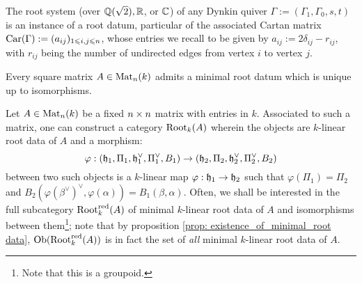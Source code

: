             \begin{example} \label{example: root_data_of_dynkin_quivers}
                The root system (over $\mathbb{Q}(\sqrt{2}), \mathbb{R}$, or $\mathbb{C}$) of any Dynkin quiver $\Gamma := (\Gamma_1, \Gamma_0, s, t)$ is an instance of a root datum, particular of the associated Cartan matrix $\mathrm{Car}(\Gamma) := (a_{ij})_{1 \leqslant i, j \leqslant n}$, whose entries we recall to be given by $a_{ij} := 2\delta_{ij} - r_{ij}$, with $r_{ij}$ being the number of undirected edges from vertex $i$ to vertex $j$. 
            \end{example}
            \begin{proposition} \label{prop: existence_of_minimal_root data}
                \cite[Proposition 14.2]{carter_affine_lie_algebras} Every square matrix $A \in \mathrm{Mat}_n(k)$ admits a minimal root datum which is unique up to isomorphisms.
            \end{proposition}
            \begin{definition} \label{def: morphisms_of_root data}
                Let $A \in \mathrm{Mat}_n(k)$ be a fixed $n \x n$ matrix with entries in $k$. Associated to such a matrix, one can construct a category $\mathrm{Root}_k(A)$ wherein the objects are $k$-linear root data of $A$ and a morphism:
                    $$\varphi: (\mathfrak{h}_1, \Pi_1, \mathfrak{h}_1^{\vee}, \Pi_1^{\vee}, B_1) \to (\mathfrak{h}_2, \Pi_2, \mathfrak{h}_2^{\vee}, \Pi_2^{\vee}, B_2)$$
                between two such objects is a $k$-linear map $\varphi: \mathfrak{h}_1 \to \mathfrak{h}_2$ such that $\varphi(\Pi_1) = \Pi_2$ and $B_2(\varphi(\beta^{\vee})^{\vee}, \varphi(\alpha)) = B_1(\beta, \alpha)$. Often, we shall be interested in the full subcategory $\mathrm{Root}_k^{\mathrm{red}}(A)$ of minimal $k$-linear root data of $A$ and isomorphisms between them\footnote{Note that this is a groupoid.}; note that by proposition \ref{prop: existence_of_minimal_root data}, $\mathrm{Ob}(\mathrm{Root}_k^{\mathrm{red}}(A))$ is in fact the set of \textit{all} minimal $k$-linear root data of $A$.
            \end{definition}
    
